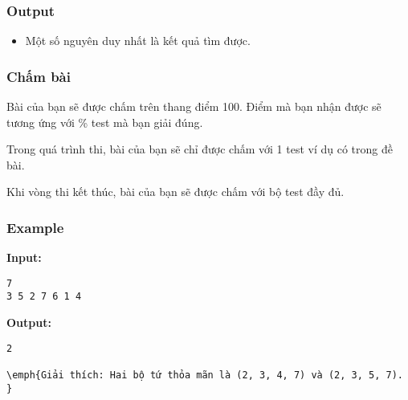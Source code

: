 \subsubsection{Output}
\begin{itemize}
	\item Một số nguyên duy nhất là kết quả tìm được.
\end{itemize}

\subsubsection{Chấm bài}

Bài của bạn sẽ được chấm trên thang điểm 100. Điểm mà bạn nhận được sẽ tương ứng với \% test mà bạn giải đúng.

Trong quá trình thi, bài của bạn sẽ chỉ được chấm với 1 test ví dụ có trong đề bài.

Khi vòng thi kết thúc, bài của bạn sẽ được chấm với bộ test đầy đủ.

\subsubsection{Example}

\textbf{Input: }
\begin{verbatim}
7
3 5 2 7 6 1 4\end{verbatim}

\textbf{Output: }
\begin{verbatim}
2

\emph{Giải thích: Hai bộ tứ thỏa mãn là (2, 3, 4, 7) và (2, 3, 5, 7). }\end{verbatim}